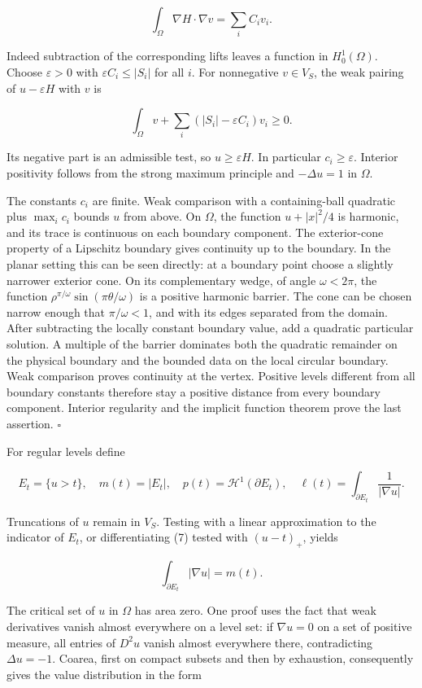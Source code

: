 \documentclass[11pt]{article}
\begin{document}
\[
\int_\Omega\nabla H\cdot\nabla v=\sum_i C_iv_i.
\]

Indeed subtraction of the corresponding lifts leaves a function in
\(H_0^1(\Omega)\). Choose \(\varepsilon>0\) with
\(\varepsilon C_i\le|S_i|\) for all \(i\). For nonnegative \(v\in V_S\),
the weak pairing of \(u-\varepsilon H\) with \(v\) is

\[
\int_\Omega v+\sum_i(|S_i|-\varepsilon C_i)v_i\ge0.
\]

Its negative part is an admissible test, so \(u\ge\varepsilon H\). In
particular \(c_i\ge\varepsilon\). Interior positivity follows from the
strong maximum principle and \(-\Delta u=1\) in \(\Omega\).

The constants \(c_i\) are finite. Weak comparison with a containing-ball
quadratic plus \(\max_i c_i\) bounds \(u\) from above. On \(\Omega\),
the function \(u+|x|^2/4\) is harmonic, and its trace is continuous on
each boundary component. The exterior-cone property of a Lipschitz
boundary gives continuity up to the boundary. In the planar setting this
can be seen directly: at a boundary point choose a slightly narrower
exterior cone. On its complementary wedge, of angle \(\omega<2\pi\), the
function \(\rho^{\pi/\omega}\sin(\pi\theta/\omega)\) is a positive
harmonic barrier. The cone can be chosen narrow enough that
\(\pi/\omega<1\), and with its edges separated from the domain. After
subtracting the locally constant boundary value, add a quadratic
particular solution. A multiple of the barrier dominates both the
quadratic remainder on the physical boundary and the bounded data on the
local circular boundary. Weak comparison proves continuity at the
vertex. Positive levels different from all boundary constants therefore
stay a positive distance from every boundary component. Interior
regularity and the implicit function theorem prove the last assertion.
\(\square\)

For regular levels define

\[
E_t=\{u>t\},\quad m(t)=|E_t|,\quad
p(t)=\mathcal H^1(\partial E_t),\quad
\ell(t)=\int_{\partial E_t}\frac1{|\nabla u|}.
\tag{9}
\]

Truncations of \(u\) remain in \(V_S\). Testing with a linear
approximation to the indicator of \(E_t\), or differentiating (7) tested
with \((u-t)_+\), yields

\[
\int_{\partial E_t}|\nabla u|=m(t).
\tag{10}
\]

The critical set of \(u\) in \(\Omega\) has area zero. One proof uses
the fact that weak derivatives vanish almost everywhere on a level set:
if \(\nabla u=0\) on a set of positive measure, all entries of \(D^2u\)
vanish almost everywhere there, contradicting \(\Delta u=-1\). Coarea,
first on compact subsets and then by exhaustion, consequently gives the
value distribution in the form
\end{document}
